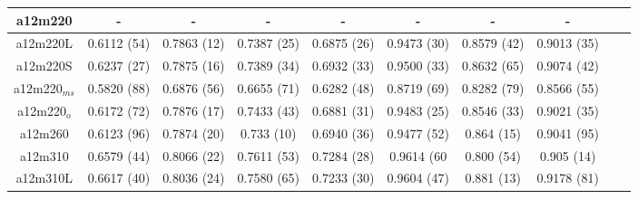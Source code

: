 \documentclass{article}
\begin{document}
\begin{table}[h!]
\begin{tabular}{|| c |c | c | c | c | c | c | c | c | c | ||}
 \hline
 a12m220 
  & {-}   &   {-} & {-}   & {-}   & {-}  & {-} & {-} \\ 
 \hline
  a12m220L 
  & {0.6112 (54)}   &   {0.7863 (12)} & {0.7387 (25)}   & {0.6875 (26)}   & {0.9473 (30)}  & {0.8579 (42)} & { 0.9013 (35)} \\ 
 \hline
  a12m220S 
  & {0.6237 (27)}   &   { 0.7875 (16)} & {0.7389 (34)}   & {0.6932 (33)}   & {0.9500 (33)}  & { 0.8632 (65)} & {0.9074 (42)} \\ 
 \hline
  a12m220$_{ms}$ 
  & {0.5820 (88)}   &   {0.6876 (56)} & {0.6655 (71)}   & {0.6282 (48)}   & {0.8719 (69)}  & {0.8282 (79)} & {0.8566 (55)} \\ 
 \hline
  a12m220$_o$ 
  & { 0.6172 (72)}   &   { 0.7876 (17)} & {0.7433 (43)}   & {0.6881 (31)}   & { 0.9483 (25)}  & {0.8546 (33)} & { 0.9021 (35)} \\ 
 \hline
  a12m260 
  & {0.6123 (96)}   &   {0.7874 (20)} & {0.733 (10)}   & {0.6940 (36)}   & {0.9477 (52)}  & {0.864 (15)} & {0.9041 (95)} \\ 
 \hline
  a12m310 
  & {0.6579 (44)}   &   {0.8066 (22)} & {0.7611 (53)}   & {0.7284 (28)}   & {0.9614 (60}  & {0.800 (54)} & { 0.905 (14)} \\ 
 \hline
  a12m310L 
  & {0.6617 (40)}   &   {0.8036 (24)} & {0.7580 (65)}   & {0.7233 (30)}   & {0.9604 (47)}  & {0.881 (13)} & {0.9178 (81)} \\ 
 \hline
 
 \end{tabular}
\end{table}
\clearpage
\end{document}
